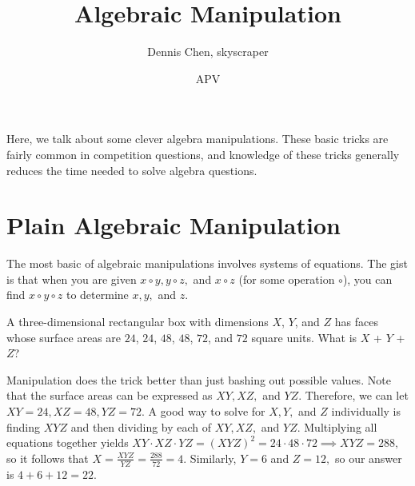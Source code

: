 \documentclass{article}
\title{Algebraic Manipulation}
\author{Dennis Chen, skyscraper}
\date{APV}
\begin{document}
\maketitle

Here, we talk about some clever algebra manipulations. These basic tricks are fairly common in competition questions, and knowledge of these tricks generally reduces the time needed to solve algebra questions.

\section{Plain Algebraic Manipulation}

The most basic of algebraic manipulations involves systems of equations. The gist is that when you are given $x\circ y,y\circ z,$ and $x\circ z$ (for some operation $\circ$), you can find $x \circ y \circ z$ to determine $x,y,$ and $z.$
\begin{exam}[2018 AMC 10B/4]
A three-dimensional rectangular box with dimensions $X$, $Y$, and $Z$ has faces whose surface areas are $24$, $24$, $48$, $48$, $72$, and $72$ square units. What is $X$ + $Y$ + $Z$?
\end{exam}
\begin{sol}
Manipulation does the trick better than just bashing out possible values. Note that the surface areas can be expressed as $XY,XZ,$ and $YZ.$ Therefore, we can let $XY = 24, XZ = 48, YZ = 72.$ A good way to solve for $X,Y,$ and $Z$ individually is finding $XYZ$ and then dividing by each of $XY, XZ,$ and $YZ.$ Multiplying all equations together yields $XY \cdot XZ \cdot YZ = (XYZ)^2 = 24 \cdot 48 \cdot 72 \implies XYZ = 288,$ so it follows that $X = \frac{XYZ}{YZ} = \frac{288}{72} = 4.$ Similarly, $Y = 6$ and $Z=12,$ so our answer is $4+6+12= 22.$
\end{sol}
\begin{exam}[Classic]
Find positive integers $a,b,$ and $c$ that satisfy
\begin{align*}
(a+b)(a+c)=96(b+c) \\
(a+b)(b+c)=54(a+c) \\
(a+c)(b+c)=24(a+b)
\end{align*}}
\end{exam}
\end{document}
